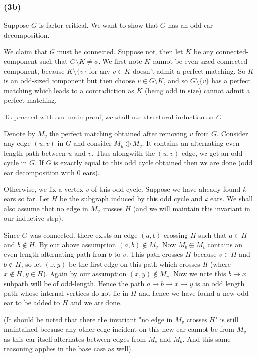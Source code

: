 \documentclass[12pt]{article}
\begin{document}
\subsubsection*{(3b)}

Suppose $G$ is factor critical. We want to show that $G$ has an odd-ear decomposition. 

We claim that $G$ must be connected. Suppose not, then let $K$ be any connected-component such that $G \setminus K \neq \phi$. We first note $K$ cannot be even-sized connected-component, because $K \setminus \{v\}$ for any $v \in K$ doesn't admit a perfect matching. So $K$ is an odd-sized component but then choose $v \in G \setminus K$, and so $G \setminus \{v\}$ has a perfect matching which leads to a contradiction as $K$ (being odd in size) cannot admit a perfect matching.

To proceed with our main proof, we shall use structural induction on $G$.

Denote by $M_v$ the perfect matching obtained after removing $v$ from $G$. Consider any edge $(u,v)$ in $G$ and consider $M_u \oplus M_v$. It contains an alternating even-length path between $u$ and $v$. Thus alongwith the $(u,v)$ edge, we get an odd cycle in $G$. If $G$ is exactly equal to this odd cycle obtained then we are done (odd ear decomposition with $0$ ears). 

Otherwise, we fix a vertex $v$ of this odd cycle. Suppose we have already found $k$ ears so far. Let $H$ be the subgraph induced by this odd cycle and $k$ ears. We shall also assume that no edge in $M_v$ crosses $H$ (and we will maintain this invariant in our inductive step).

Since $G$ was connected, there exists an edge $(a,b)$ crossing $H$ such that $a \in H$ and $b \not \in H$. By our above assumption $(a,b) \not \in M_v$. Now $M_b \oplus M_v$ contains an even-length alternating path from $b$ to $v$. This path crosses $H$ because $v \in H$ and $b \not \in H$, so let $(x,y)$ be the first edge on this path which crosses $H$ (where $x \not \in H, y \in H$). Again by our assumption $(x,y) \not \in M_v$. Now we note this $b \longrightarrow x$ subpath will be of odd-length. Hence the path $a \rightarrow b \longrightarrow x \rightarrow y$ is an odd length path whose internal vertices do not lie in $H$ and hence we have found a new odd-ear to be added to $H$ and we are done.

(It should be noted that there the invariant "no edge in $M_v$ crosses $H$" is still maintained because any other edge incident on this new ear cannot be from $M_v$ as this ear itself alternates between edges from $M_v$ and $M_b$. And this same reasoning applies in the base case as well).
\end{document}
